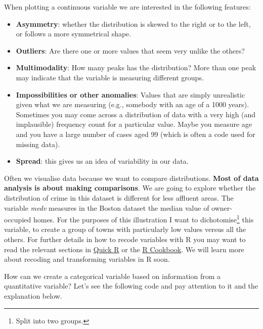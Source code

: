 \documentclass[
]{book}
\newenvironment{Shaded}{\begin{snugshade}}{\end{snugshade}}
\newcommand{\FloatTok}[1]{\textcolor[rgb]{0.00,0.00,0.81}{#1}}
\newcommand{\NormalTok}[1]{#1}
\newcommand{\OtherTok}[1]{\textcolor[rgb]{0.56,0.35,0.01}{#1}}
\newcommand{\SpecialCharTok}[1]{\textcolor[rgb]{0.00,0.00,0.00}{#1}}
\newcommand{\StringTok}[1]{\textcolor[rgb]{0.31,0.60,0.02}{#1}}
\providecommand{\tightlist}{%
  \setlength{\itemsep}{0pt}\setlength{\parskip}{0pt}}
\begin{document}
When plotting a continuous variable we are interested in the following features:

\begin{itemize}
\tightlist
\item
  \textbf{Asymmetry}: whether the distribution is skewed to the right or to the left, or follows a more symmetrical shape.
\item
  \textbf{Outliers}: Are there one or more values that seem very unlike the others?
\item
  \textbf{Multimodality}: How many peaks has the distribution? More than one peak may indicate that the variable is measuring different groups.
\item
  \textbf{Impossibilities or other anomalies}: Values that are simply unrealistic given what we are measuring (e.g., somebody with an age of a 1000 years). Sometimes you may come across a distribution of data with a very high (and implausible) frequency count for a particular value. Maybe you measure age and you have a large number of cases aged 99 (which is often a code used for missing data).
\item
  \textbf{Spread}: this gives us an idea of variability in our data.
\end{itemize}

Often we visualise data because we want to compare distributions. \textbf{Most of data analysis is about making comparisons}. We are going to explore whether the distribution of crime in this dataset is different for less affluent areas. The variable \emph{medv} measures in the Boston dataset the median value of owner-occupied homes. For the purposes of this illustration I want to dichotomise\footnote{Split into two groups.} this variable, to create a group of towns with particularly low values versus all the others. For further details in how to recode variables with R you may want to read the relevant sections in \href{http://www.statmethods.net/management/variables.html}{Quick R} or the \href{http://www.cookbook-r.com/Manipulating_data/Recoding_data/}{R Cookbook}. We will learn more about recoding and transforming variables in R soon.

How can we create a categorical variable based on information from a quantitative variable? Let's see the following code and pay attention to it and the explanation below.

\begin{Shaded}
\end{Shaded}
\end{document}
